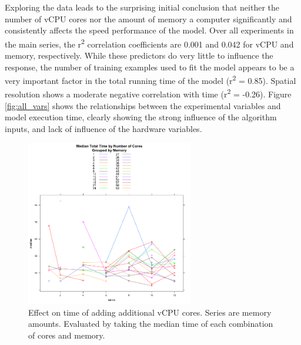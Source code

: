 \documentclass[a4paper]{article}
\begin{document}
Exploring the data leads to the surprising initial conclusion that neither the number of vCPU cores nor the amount of memory a computer significantly and consistently affects the speed performance of the model.  Over all experiments in the main series, the r\textsuperscript{2} correlation coefficients are 0.001 and 0.042 for vCPU and memory, respectively.  While these predictors do very little to influence the response, the number of training examples used to fit the model appears to be a very important factor in the total running time of the model (r\textsuperscript{2} = 0.85).  Spatial resolution shows a moderate negative correlation with time (r\textsuperscript{2} = -0.26).  Figure \ref{fig:all_vars} shows the relationships between the experimental variables and model execution time, clearly showing the strong influence of the algorithm inputs, and lack of influence of the hardware variables.

\begin{figure}
\centering
\includegraphics[width=0.65\textwidth]{Cores_and_memory.png}
\caption{Effect on time of adding additional vCPU cores.  Series are memory amounts. Evaluated by taking the median time of each combination of cores and memory.}\label{fig:cores_vs_memory}
\end{figure}
\end{document}
